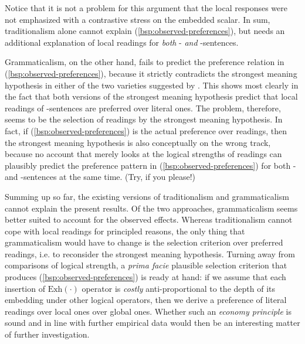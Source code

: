 \documentclass[fleqn,reqno,10pt,draft]{article}
\newcommand{\as}{\acro{as}}
\renewcommand{\es}{\acro{es}}
\newcommand{\exh}{\ensuremath{\mathrm{Exh}}}
\begin{document}
Notice that it is not a problem for this argument that the local
responses were not emphasized with a contrastive stress on the
embedded scalar. In sum, traditionalism alone cannot explain
(\ref{bsp:observed-preferences}), but needs an additional explanation
of local readings for \emph{both} \as- \emph{and} \es-sentences.

Grammaticalism, on the other hand, fails to predict the preference
relation in (\ref{bsp:observed-preferences}), because it strictly
contradicts the strongest meaning hypothesis in either of the two
varieties suggested by \citet{ChierchiaFox2008:The-Grammatical}. This
shows most clearly in the fact that both versions of the strongest
meaning hypothesis predict that local readings of \as-sentences are
preferred over literal ones. The problem, therefore, seems to be the
selection of readings by the strongest meaning hypothesis. In fact, if
(\ref{bsp:observed-preferences}) is the actual preference over
readings, then the strongest meaning hypothesis is also conceptually
on the wrong track, because no account that merely looks at the
logical strengths of readings can plausibly predict the preference
pattern in (\ref{bsp:observed-preferences}) for both \as- and
\es-sentences at the same time. (Try, if you please!) 

Summing up so far, the existing versions of traditionalism and grammaticalism
cannot explain the present results. Of the two approaches, grammaticalism 
seems better suited to account for the observed effects. Whereas 
traditionalism cannot cope with local readings for principled reasons, 
the only thing that grammaticalism would have to change is the 
selection criterion over preferred readings, i.e. to reconsider the strongest
meaning hypothesis. Turning away from comparisons of logical strength,
a \emph{prima facie} plausible selection criterion that produces
(\ref{bsp:observed-preferences}) is ready at hand: if we assume that
each insertion of $\exh(\cdot)$ operator is \emph{costly}
anti-proportional to the depth of its embedding under other logical
operators, then we derive a preference of literal readings over local
ones over global ones. Whether such an \emph{economy principle} is
sound and in line with further empirical data would then be an
interesting matter of further investigation. 
\end{document}
